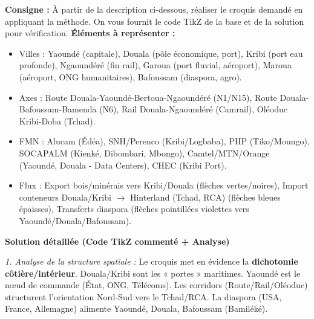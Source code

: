 \documentclass[11pt]{article}
\begin{document}
\begin{exoresolu}
\textbf{Consigne :} À partir de la description ci-dessous, réaliser le croquis demandé en appliquant la méthode. On vous fournit le code TikZ de la base et de la solution pour vérification.
\textbf{Éléments à représenter :}
\begin{itemize}
    \item Villes : Yaoundé (capitale), Douala (pôle économique, port), Kribi (port eau profonde), Ngaoundéré (fin rail), Garoua (port fluvial, aéroport), Maroua (aéroport, ONG humanitaires), Bafoussam (diaspora, agro).
    \item Axes : Route Douala-Yaoundé-Bertoua-Ngaoundéré (N1/N15), Route Douala-Bafoussam-Bamenda (N6), Rail Douala-Ngaoundéré (Camrail), Oléoduc Kribi-Doba (Tchad).
    \item FMN : Alucam (Édéa), SNH/Perenco (Kribi/Logbaba), PHP (Tiko/Moungo), SOCAPALM (Kienké, Dibombari, Mbongo), Camtel/MTN/Orange (Yaoundé, Douala - Data Centers), CHEC (Kribi Port).
    \item Flux : Export bois/minérais vers Kribi/Douala (flèches vertes/noires), Import conteneurs Douala/Kribi $\rightarrow$ Hinterland (Tchad, RCA) (flèches bleues épaisses), Transferts diaspora (flèches pointillées violettes vers Yaoundé/Douala/Bafoussam).
\end{itemize}
\tcblower
\textbf{Solution détaillée (Code TikZ commenté + Analyse)}

\textit{1. Analyse de la structure spatiale :}
Le croquis met en évidence la \textbf{dichotomie côtière/intérieur}. Douala/Kribi sont les « portes » maritimes. Yaoundé est le nœud de commande (État, ONG, Télécoms). Les corridors (Route/Rail/Oléoduc) structurent l'orientation Nord-Sud vers le Tchad/RCA. La diaspora (USA, France, Allemagne) alimente Yaoundé, Douala, Bafoussam (Bamiléké).


\end{exoresolu}
\end{document}
